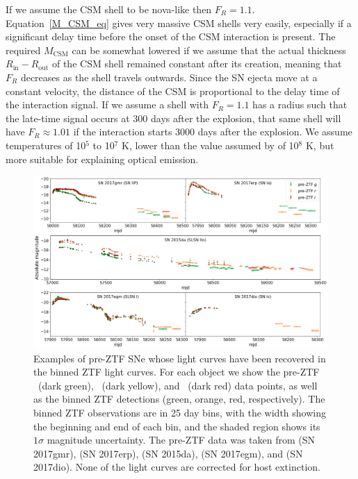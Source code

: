 \documentclass[a4paper,oneside,12pt, class=Latex/Classes/PhDthesisPSnPDF, crop=false]{standalone}
\begin{document}
If we assume the CSM shell to be nova-like then $F_R=1.1$. Equation~\ref{M_CSM_eq} gives very massive CSM shells very easily, especially if a significant delay time before the onset of the CSM interaction is present.  The required $M_\text{CSM}$ can be somewhat lowered if we assume that the actual thickness $R_\text{in} - R_\text{out}$ of the CSM shell remained constant after its creation, meaning that $F_R$ decreases as the shell travels outwards. Since the SN ejecta move at a constant velocity, the distance of the CSM is proportional to the delay time of the interaction signal. If we assume a shell with $F_R = 1.1$ has a radius such that the late-time signal occurs at 300 days after the explosion, that same shell will have $F_R \approx 1.01$ if the interaction starts 3000 days after the explosion. We assume temperatures of 10$^5$ to 10$^7$ K,  lower than the value assumed by \cite{2015cp} of 10$^8$ K, but more suitable for explaining optical emission.


\begin{figure}
    \centering
    \includegraphics[width=\textwidth]{../Images/chapter_4/tails.png}
    \caption{Examples of pre-ZTF SNe whose light curves have been recovered in the binned ZTF light curves. For each object we show the pre-ZTF \ztfg~(dark green), \ztfr~(dark yellow), and \ztfi~(dark red) data points, as well as the binned ZTF detections (green, orange, red, respectively). The binned ZTF observations are in 25 day bins, with the width showing the beginning and end of each bin, and the shaded region shows its $1\sigma$ magnitude uncertainty. The pre-ZTF data was taken from \citet{2017gmr} (SN 2017gmr), \citet{2017erp} (SN 2017erp), \citet{2015da_2020} (SN 2015da), \citet{2017egm} (SN 2017egm), and \citet{2017dio} (SN 2017dio). None of the light curves are corrected for host extinction.}
    \label{tail-examples}
\end{figure}
\end{document}
